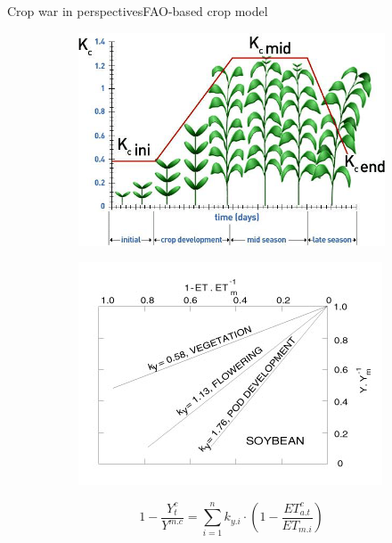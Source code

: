 \documentclass[10pt, aspectratio=169]{beamer}
\begin{document}
\begin{frame}{Crop war in perspectives}{FAO-based crop model}{}

  \begin{figure}
   \hfill
        \newline 
     \centering
     \begin{subfigure}[b]{0.45\textwidth}

         \centering
         \includegraphics[width=\textwidth]{Presentation/Figures/Crop-coefficients-Kc-and-growing-period-of-tomato-source-Allen-et-al-1998.png}
         \label{fig:y equals x}
     \end{subfigure}
 \hfill
     \begin{subfigure}[b]{0.45\textwidth}
         \centering
         \includegraphics[width=\linewidth]{Presentation/Figures/Y3655E01.jpeg}
     \end{subfigure}
     \hfill

\end{figure}
 
    \begin{equation}
            1-\frac{Y_t^c}{Y^{m.c}}=\sum_{i=1}^{n} k_{y.i} \cdot(1-\frac{ET_{a.t}^c}{ET_{m.i}}) 
         \end{equation}

\end{frame}
\end{document}
